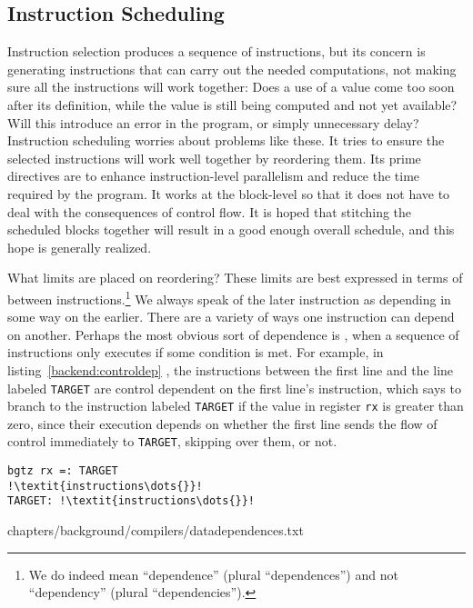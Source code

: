 \subsection{Instruction Scheduling}
Instruction selection produces a sequence of instructions, but its concern is generating instructions that can carry out the needed computations, not making sure all the instructions will work together: Does a use of a value come too soon after its definition, while the value is still being computed and not yet available? Will this introduce an error in the program, or simply unnecessary delay? Instruction scheduling worries about problems like these. It tries to ensure the selected instructions will work well together by reordering them. Its prime directives are to enhance instruction-level parallelism and reduce the time required by the program. It works at the block-level so that it does not have to deal with the consequences of control flow. It is hoped that stitching the scheduled blocks together will result in a good enough overall schedule, and this hope is generally realized.

What limits are placed on reordering? These limits are best expressed in terms of  between instructions.\footnote{We do indeed mean ``dependence'' (plural ``dependences'') and not ``dependency'' (plural ``dependencies'').} We always speak of the later instruction as depending in some way on the earlier. There are a variety of ways one instruction can depend on another. Perhaps the most obvious sort of dependence is , when a sequence of instructions only executes if some condition is met. For example, in listing~\ref{backend:controldep}%
, the instructions between the first line and the line labeled \lstinline{TARGET} are control dependent on the first line's instruction, which says to branch to the instruction labeled \lstinline{TARGET} if the value in register \lstinline[style=riscpseudo]{rx} is greater than zero, since their execution depends on whether the first line sends the flow of control immediately to \lstinline{TARGET}, skipping over them, or not.
\begin{lstlisting}[float=btp,%
caption={Example of control dependence},%
label={backend:controldep},%
style=riscpseudo,%
escapechar=!]
bgtz rx =: TARGET
!\textit{instructions\dots{}}!
TARGET: !\textit{instructions\dots{}}!
\end{lstlisting}%
%
{chapters/background/compilers/datadependences.txt}

